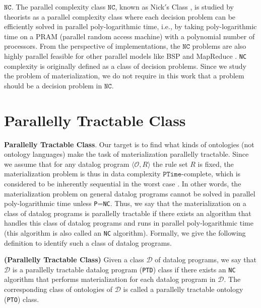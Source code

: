 \documentclass{article}
\begin{document}
\textbf{$\texttt{NC}$}. The parallel complexity class $\texttt{NC}$, known as Nick$'$s Class \cite{RAYMOND-GREENLAW}, is studied by theorists as a parallel complexity class where each decision problem can be efficiently solved in parallel poly-logarithmic time, i.e., by taking
poly-logarithmic time on a PRAM (parallel random access machine) with a polynomial number of processors.
From the
perspective of implementations, the $\texttt{NC}$ problems are also highly parallel feasible for
other parallel models like BSP \cite{DBLP:journals/cacm/Valiant90} and MapReduce \cite{DBLP:conf/soda/KarloffSV10}. \texttt{NC} complexity is originally defined as a class of decision problems. Since we study the problem of materialization, we do not require in this work that a
problem should be a decision problem in $\texttt{NC}$.

\section{Parallelly Tractable Class}

\noindent\textbf{Parallelly Tractable Class}. Our target is to find what kinds of ontologies (not ontology languages) make the task of materialization parallelly tractable. Since we assume that for any datalog program $\langle\mathcal{O}, R\rangle$ the rule set $R$ is fixed, the materialization problem is thus in data complexity $\texttt{PTime}$-complete, which is considered to be inherently sequential in the worst case \cite{RAYMOND-GREENLAW}. In other words, the materialization problem on general datalog programs cannot be solved in parallel poly-logarithmic time unless \texttt{P}=\texttt{NC}. Thus, we say that
the materialization on a class of datalog programs is parallelly tractable if there exists an algorithm that handles this class of datalog programs and runs in parallel poly-logarithmic time (this algorithm is also called an \texttt{NC} algorithm). Formally, we give the following definition to identify such a class of datalog programs.

\begin{definition}\label{def:ptd}
\textbf{(Parallelly Tractable Class)} Given a class $\mathcal{D}$ of datalog programs,
we say that $\mathcal{D}$ is a parallelly tractable datalog program (\texttt{PTD}) class if there exists an \texttt{NC} algorithm that performs materialization for each datalog program in $\mathcal{D}$. The corresponding class of ontologies of $\mathcal{D}$ is called a parallelly tractable ontology (\texttt{PTO}) class.
\end{definition}
\end{document}
